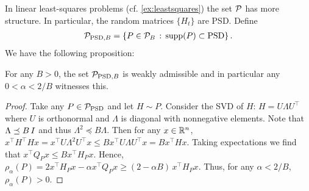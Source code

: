 In linear least-squares problems (cf. \cref{ex:leastsquares}) the set $\mathcal{P}$ has more structure.
In particular, the random matrices $\{H_t\}$ are PSD. 
Define
\begin{align*}
\mathcal{P}_{\text{PSD},B} = \{ P \in \mathcal{P}_B \,:\,  \operatorname{supp}(P)\subset \text{PSD} \}\,.
\end{align*}
We have the following proposition:
\begin{proposition}
For any $B>0$, the set $\mathcal{P}_{\text{PSD},B}$ is weakly admissible
and in particular any $0<\alpha < 2/B$ witnesses this.
\end{proposition}
\begin{proof}
Take any $P\in \mathcal{P}_{\text{PSD}}$ and let $H\sim P$.
Consider the SVD of $H$: $H = U \Lambda U^\top$ where $U$ is orthonormal and $\Lambda$ is diagonal with
nonnegative elements. Note that $\Lambda \preceq B\, I$ and thus $\Lambda^2 \preceq B \Lambda$.
Then for any $x\in \mathbb{R}^n$, $x^\top H^\top H x = x^\top U \Lambda^2 U^\top x \le B x^\top U \Lambda U^\top x = B x^\top H x$.
Taking expectations we find that $x^\top Q_P x \le B x^\top H_P x$.
Hence, $\rho_\alpha(P) = 2 x^\top H_P x - \alpha x^\top Q_P x \ge (2- \alpha B ) \,x^\top H_P x $.
Thus, for any $\alpha<2/B$, $\rho_\alpha(P)>0$.
\end{proof}

